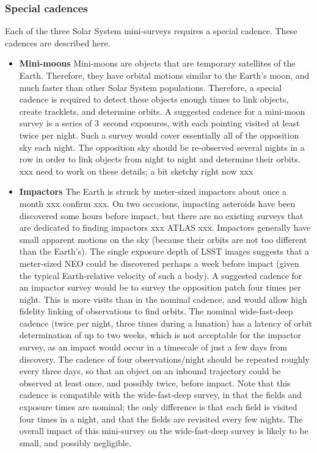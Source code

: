 \subsubsection{Special cadences}

Each of the three Solar System mini-surveys requires a special
cadence. These cadences are described here.

\begin{itemize}

\item{{\bf Mini-moons}}
Mini-moons are objects that are temporary satellites of the Earth.
Therefore, they have orbital motions similar to the Earth's moon,
and much faster than other Solar System populations. Therefore,
a special cadence is required to detect these objects enough
times to link objects, create tracklets, and determine orbits.
A suggested cadence for a mini-moon survey is a series
of 3~second exposures, with each pointing visited at least
twice per night. Such a survey would cover essentially
all of the opposition sky each night. The opposition sky should
be re-observed several nights in a row in order to 
link objects from night to night and determine their orbits.
xxx need to work on these details; a bit sketchy right now xxx

\item{{\bf Impactors}}
The Earth is struck by meter-sized impactors about
once a month xxx confirm xxx.
On two occasions, impacting asteroids have 
been discovered some hours before impact, but
there are no existing surveys that are dedicated to finding
impactors xxx ATLAS xxx.
Impactors generally have small apparent motions 
on the sky (because their orbits are not too different
than the Earth's). The single exposure depth of LSST
images suggests that a meter-sized NEO could be 
discovered perhaps a week before impact (given 
the typical Earth-relative velocity of such a body).
A suggested cadence for an impactor survey would be
to survey the opposition patch four times per night.
This is more visits than in the nominal cadence, and
would allow high fidelity linking of observations to
find orbits. The nominal wide-fast-deep cadence
(twice per night, three times during a lunation) has
a latency of orbit determination of up to two weeks,
which is not acceptable for the impactor survey, as an
impact would occur in a timescale of just a few days
from discovery.
The cadence of four observations/night should be repeated
roughly every three days, so that an object on an
inbound trajectory could be observed at least once,
and possibly twice, before impact.
Note that this cadence is compatible with 
the wide-fast-deep survey, in that the fields and
exposure times are nominal; the only difference is that
each field is visited four times in a night, and that
the fields are revisited every few nights. The overall
impact of this mini-survey on the wide-fast-deep
survey is likely to be small, and possibly negligible.


\end{itemize}

